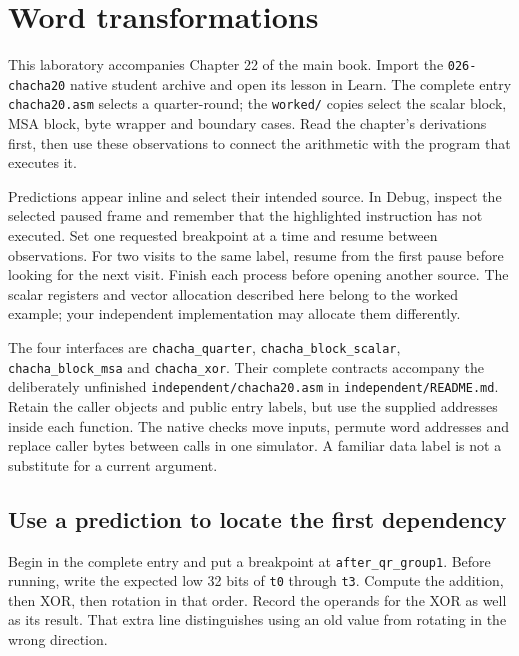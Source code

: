 \chapter{Word transformations}
\label{revision:chacha-lab}

This laboratory accompanies Chapter 22 of the main book. Import the
\texttt{026-chacha20} native student archive and open its lesson in Learn.
The complete entry \texttt{chacha20.asm} selects a quarter-round; the
\texttt{worked/} copies select the scalar block, MSA block, byte wrapper and
boundary cases. Read the chapter's derivations first, then use these observations
to connect the arithmetic with the program that executes it.

Predictions appear inline and select their intended source. In Debug, inspect
the selected paused frame and remember that the highlighted instruction has not
executed. Set one requested breakpoint at a time and resume between observations.
For two visits to the same label, resume from the first pause before looking for
the next visit. Finish each process before opening another source. The scalar
registers and vector allocation described here belong to the worked example;
your independent implementation may allocate them differently.

The four interfaces are \texttt{chacha\_quarter},
\texttt{chacha\_block\_scalar}, \texttt{chacha\_block\_msa} and
\texttt{chacha\_xor}. Their complete contracts accompany the deliberately
unfinished \texttt{independent/chacha20.asm} in
\texttt{independent/README.md}. Retain the caller objects and public entry
labels, but use the supplied addresses inside each function. The native checks
move inputs, permute word addresses and replace caller bytes between calls in
one simulator. A familiar data label is not a substitute for a current argument.

\section{Use a prediction to locate the first dependency}

Begin in the complete entry and put a breakpoint at
\texttt{after\_qr\_group1}. Before running, write the expected low 32 bits of
\texttt{t0} through \texttt{t3}. Compute the addition, then XOR, then rotation
in that order. Record the operands for the XOR as well as its result. That
extra line distinguishes using an old value from rotating in the wrong direction.

